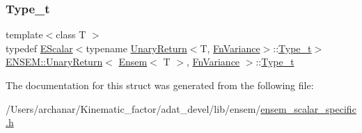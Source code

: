 \subsubsection{\texorpdfstring{Type\_t}{Type\_t}\hspace{0.1cm}{\footnotesize\ttfamily [2/2]}}
{\footnotesize\ttfamily template$<$class T $>$ \\
typedef \mbox{\hyperlink{classENSEM_1_1EScalar}{E\+Scalar}}$<$typename \mbox{\hyperlink{structENSEM_1_1UnaryReturn}{Unary\+Return}}$<$T, \mbox{\hyperlink{structENSEM_1_1FnVariance}{Fn\+Variance}}$>$\+::\mbox{\hyperlink{structENSEM_1_1UnaryReturn_3_01Ensem_3_01T_01_4_00_01FnVariance_01_4_ab460044d5646089e41eebeb2f5be9f33}{Type\+\_\+t}}$>$ \mbox{\hyperlink{structENSEM_1_1UnaryReturn}{E\+N\+S\+E\+M\+::\+Unary\+Return}}$<$ \mbox{\hyperlink{classENSEM_1_1Ensem}{Ensem}}$<$ T $>$, \mbox{\hyperlink{structENSEM_1_1FnVariance}{Fn\+Variance}} $>$\+::\mbox{\hyperlink{structENSEM_1_1UnaryReturn_3_01Ensem_3_01T_01_4_00_01FnVariance_01_4_ab460044d5646089e41eebeb2f5be9f33}{Type\+\_\+t}}}



The documentation for this struct was generated from the following file\+:\begin{DoxyCompactItemize}
\item 
/\+Users/archanar/\+Kinematic\+\_\+factor/adat\+\_\+devel/lib/ensem/\mbox{\hyperlink{lib_2ensem_2ensem__scalar__specific_8h}{ensem\+\_\+scalar\+\_\+specific.\+h}}\end{DoxyCompactItemize}
